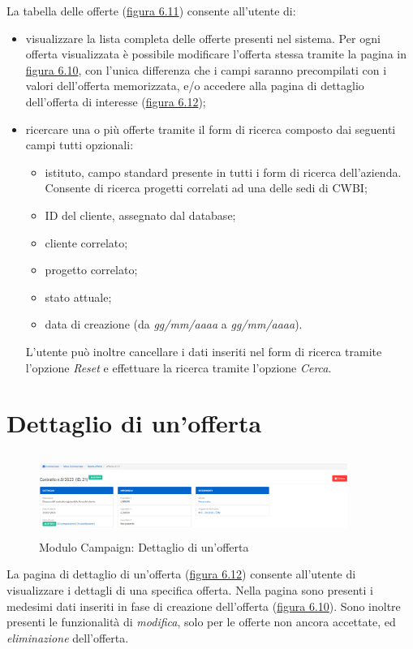 \noindent La tabella delle offerte ({\hyperref[fig:tabellaOfferte]{figura 6.11}}) consente all'utente di:
\begin{itemize}
\item visualizzare la lista completa delle offerte presenti nel sistema. Per ogni offerta visualizzata è possibile modificare l'offerta stessa tramite la pagina in {\hyperref[fig:nuovaOfferta]{figura 6.10}}, con l'unica differenza che i campi saranno precompilati con i valori dell'offerta memorizzata, e/o accedere alla  pagina di dettaglio dell'offerta di interesse ({\hyperref[fig:dettaglioOfferta]{figura 6.12}}); 
\item ricercare una o più offerte tramite il form di ricerca composto dai seguenti campi tutti opzionali:
\begin{itemize}
\item istituto, campo standard presente in tutti i form di ricerca dell'azienda. Consente di ricerca progetti correlati ad una delle sedi di CWBI;
\item ID del cliente, assegnato dal database;
\item cliente correlato;
\item progetto correlato;
\item stato attuale;
\item data di creazione (da \textit{gg/mm/aaaa} a \textit{gg/mm/aaaa}).
\end{itemize}
L'utente può inoltre cancellare i dati inseriti nel form di ricerca tramite l'opzione \textit{Reset} e effettuare la ricerca tramite l'opzione \textit{Cerca}.
\end{itemize}

\pagebreak

\section{Dettaglio di un'offerta}
\begin{figure}[!h]
\centering
\includegraphics[width=380px, height=100px]{../images/UI/12-dettaglioOfferta.png}
\caption{Modulo Campaign: Dettaglio di un'offerta}
\label{fig:dettaglioOfferta}
\end{figure}

\noindent La pagina di dettaglio di un'offerta ({\hyperref[fig:dettaglioOfferta]{figura 6.12}}) consente all'utente di visualizzare i dettagli di una specifica offerta. Nella pagina sono presenti i medesimi dati inseriti in fase di creazione dell'offerta ({\hyperref[fig:nuovaOfferta]{figura 6.10}}). Sono inoltre presenti le funzionalità di \textit{modifica}, solo per le offerte non ancora accettate, ed \textit{eliminazione} dell'offerta.